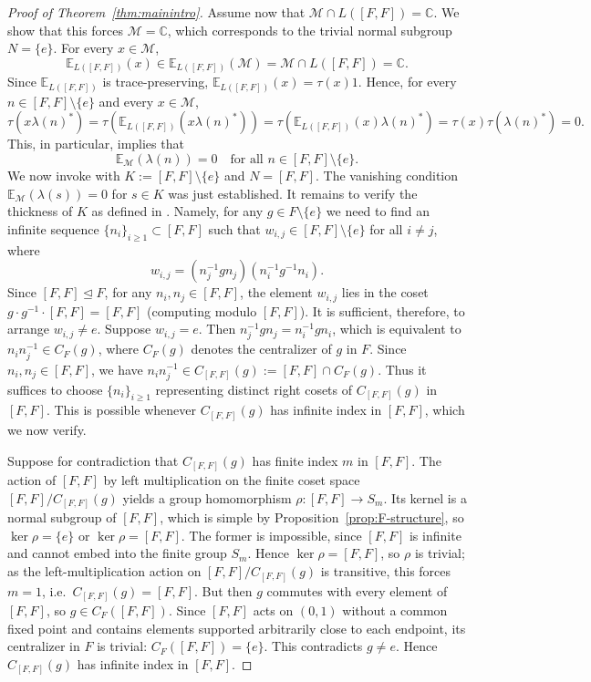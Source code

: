 \documentclass[11pt]{amsart}
\theoremstyle{definition}
\newcommand{\C}{\mathbb{C}}
\newcommand{\cM}{\mathcal{M}}
\newcommand{\EE}{\mathbb{E}}
\begin{document}
\begin{proof}[Proof of Theorem~\ref{thm:mainintro}]
Assume now that $\cM \cap L([F,F]) = \C$. We show that this forces $\cM = \C$, which corresponds to the trivial normal subgroup $N = \{e\}$. For every $x \in \cM$, $$\EE_{L([F,F])}(x) \in \EE_{L([F,F])}(\cM)=\cM \cap L([F,F]) = \C.$$ Since $\EE_{L([F,F])}$ is trace-preserving, $\EE_{L([F,F])}(x) = \tau(x) 1$. Hence, for every $n \in [F,F] \setminus \{e\}$ and every $x \in \cM$,
\[
\tau(x \lambda(n)^*) = \tau(\EE_{L([F,F])}(x \lambda(n)^*)) = \tau(\EE_{L([F,F])}(x) \lambda(n)^*) = \tau(x) \tau(\lambda(n)^*) = 0.
\]
This, in particular, implies that
\[
\EE_{\cM}(\lambda(n)) = 0 \quad \text{for all } n \in [F,F] \setminus \{e\}.
\]
We now invoke \cite[Lemma 3.6]{Amr26} with $K := [F,F] \setminus \{e\}$ and $N=[F,F]$. The vanishing condition $\EE_{\cM}(\lambda(s)) = 0$ for $s \in K$ was just established. It remains to verify the thickness of $K$ as defined in \cite[Definition 3.5]{Amr26}. Namely, for any $g \in F \setminus \{e\}$ we need to find an infinite sequence $\{n_i\}_{i \ge 1} \subset [F,F]$ such that $w_{i,j} \in [F,F] \setminus \{e\}$ for all $i \neq j$, where \[
w_{i,j} = (n_j^{-1} g n_j) (n_i^{-1} g^{-1} n_i)
.\] Since $[F,F] \trianglelefteq F$, for any $n_i, n_j \in [F,F]$, the element $w_{i,j}$
lies in the coset $g \cdot g^{-1} \cdot [F,F] = [F,F]$ (computing modulo $[F,F]$). It is sufficient, therefore, to arrange $w_{i,j} \neq e$. Suppose $w_{i,j} = e$. Then $n_j^{-1} g n_j = n_i^{-1} g n_i$, which is equivalent to $n_i n_j^{-1} \in C_F(g)$, where $C_F(g)$ denotes the centralizer of $g$ in $F$. Since $n_i, n_j \in [F,F]$, we have $n_i n_j^{-1} \in C_{[F,F]}(g) := [F,F] \cap C_F(g)$. Thus it suffices to choose $\{n_i\}_{i \ge 1}$ representing distinct right cosets of $C_{[F,F]}(g)$ in $[F,F]$. This is possible whenever $C_{[F,F]}(g)$ has infinite index in $[F,F]$, which we now verify.

Suppose for contradiction that $C_{[F,F]}(g)$ has finite index $m$ in $[F,F]$. The action of $[F,F]$ by left multiplication on the finite coset space $[F,F]/C_{[F,F]}(g)$ yields a group homomorphism $\rho \colon [F,F] \to S_m$. Its kernel is a normal subgroup of $[F,F]$, which is simple by Proposition~\ref{prop:F-structure}, so $\ker \rho = \{e\}$ or $\ker \rho = [F,F]$. The former is impossible, since $[F,F]$ is infinite and cannot embed into the finite group $S_m$. Hence $\ker \rho = [F,F]$, so $\rho$ is trivial; as the left-multiplication action on $[F,F]/C_{[F,F]}(g)$ is transitive, this forces $m = 1$, i.e.\ $C_{[F,F]}(g) = [F,F]$. But then $g$ commutes with every element of $[F,F]$, so $g \in C_F([F,F])$. Since $[F,F]$ acts on $(0,1)$ without a common fixed point and contains elements supported arbitrarily close to each endpoint, its centralizer in $F$ is trivial: $C_F([F,F]) = \{e\}$. This contradicts $g \neq e$. Hence $C_{[F,F]}(g)$ has infinite index in $[F,F]$.


\end{proof}
\end{document}
